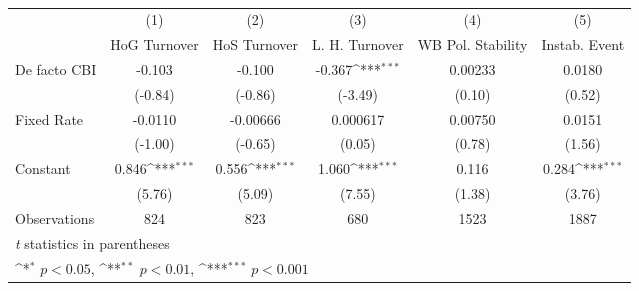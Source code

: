 \begin{table}[htbp]\centering
\def\sym#1{\ifmmode^{#1}\else\(^{#1}\)\fi}
\caption{\label{hkmultIndFEDF}}
\begin{tabular}{l*{5}{c}}
\toprule
                                        &\multicolumn{1}{c}{(1)}&\multicolumn{1}{c}{(2)}&\multicolumn{1}{c}{(3)}&\multicolumn{1}{c}{(4)}&\multicolumn{1}{c}{(5)}\\
                                        &\multicolumn{1}{c}{HoG Turnover}&\multicolumn{1}{c}{HoS Turnover}&\multicolumn{1}{c}{L. H. Turnover}&\multicolumn{1}{c}{WB Pol. Stability}&\multicolumn{1}{c}{Instab. Event}\\
\midrule
De facto CBI                            &   -0.103         &   -0.100         &   -0.367\sym{***}&  0.00233         &   0.0180         \\
                                        &  (-0.84)         &  (-0.86)         &  (-3.49)         &   (0.10)         &   (0.52)         \\
\addlinespace
Fixed Rate                              &  -0.0110         & -0.00666         & 0.000617         &  0.00750         &   0.0151         \\
                                        &  (-1.00)         &  (-0.65)         &   (0.05)         &   (0.78)         &   (1.56)         \\
\addlinespace
Constant                                &    0.846\sym{***}&    0.556\sym{***}&    1.060\sym{***}&    0.116         &    0.284\sym{***}\\
                                        &   (5.76)         &   (5.09)         &   (7.55)         &   (1.38)         &   (3.76)         \\
\midrule
Observations                            &      824         &      823         &      680         &     1523         &     1887         \\
\bottomrule
\multicolumn{6}{l}{\footnotesize \textit{t} statistics in parentheses}\\
\multicolumn{6}{l}{\footnotesize \sym{*} \(p<0.05\), \sym{**} \(p<0.01\), \sym{***} \(p<0.001\)}\\
\end{tabular}
\end{table}
